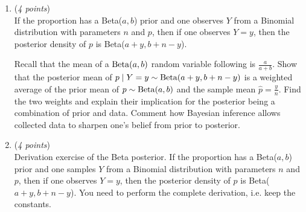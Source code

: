 \documentclass[11pt]{article}
\begin{document}
\begin{enumerate}
    \item
    ({\it{4 points}}) \\
    If the proportion has a 
\textrm{Beta}($a, b$) prior and one observes $Y$ from a \textrm{Binomial} distribution with parameters $n$ and $p$, then if one observes $Y = y$, then the posterior density of $p$ is 
\textrm{Beta}($a + y, b + n - y$).


Recall that the mean of a ${\rm Beta}(a, b)$ random variable following  is $\frac{a}{a+b}$. Show that the posterior mean of $p \mid Y = y \sim {\rm Beta}(a + y, b + n - y)$ is a weighted average of the prior mean of $p \sim {\rm Beta}(a, b)$ and the sample mean $\hat{p} = \frac{y}{n}$.  Find the two weights and explain their implication for the posterior being a combination of prior and data. Comment  how Bayesian inference allows collected data to sharpen one's belief from prior to posterior.


    \item 
    ({\it{4 points}}) \\
    Derivation exercise of the Beta posterior. If the proportion has a 
\textrm{Beta}($a, b$) prior and one samples $Y$ from a \textrm{Binomial} distribution with parameters $n$ and $p$, then if one observes $Y = y$, then the posterior density of $p$ is 
\textrm{Beta}($a + y, b + n - y$). You need to perform the complete derivation, i.e. keep the constants.







\end{enumerate}
\end{document}
